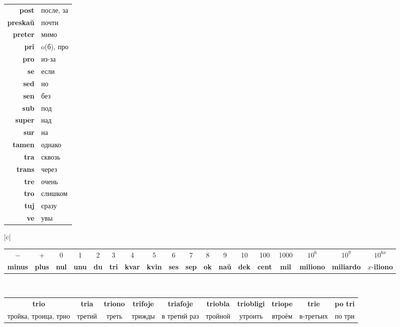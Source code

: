 \documentclass{article}
\def\b#1{\textbf{#1}}
\begin{document}
\begin{center}
\begin{tabular}{>{\bfseries}rl}
\end{tabular}
\hspace{-1.5em}
\begin{tabular}{>{\bfseries}rl}
post & после, за \\
preskaŭ & почти \\
preter & мимо \\
pri & o(б), про \\
pro & из-за \\
se & если \\
sed & но \\
sen & без \\
sub & под \\
super & над \\
sur & на \\
tamen & однако \\
tra & сквозь \\
trans & через \\
tre & очень \\
tro & слишком \\
tuj & сразу \\
ve & увы \\
\end{tabular}

\vspace{0.5em}
\begin{tabular}{|c|}
\hline
\begin{tabular}{c|c|c|c|c|c|c|c|c|c|c|c|c|c|c|c|c|c}
$-$ & $+$ & 0 & 1 & 2 & 3 & 4 & 5 & 6 & 7 & 8 & 9 & 10 & 100 & 1000 & $10^6$ & $10^9$ & $10^{6x}$ \\
\b{minus} & \b{plus} & \b{nul} & \b{unu} & \b{du} & \b{tri} & \b{kvar} & \b{kvin} & \b{ses} & \b{sep} & \b{ok} & \b{naŭ} & \b{dek} & \b{cent} & \b{mil} & \b{miliono} & \b{miliardo} & $x$-\b{iliono} \\
\end{tabular}\\
\hline
\begin{tabular}{c|c|c|c|c|c|c|c|c|c}
\b{trio} & \b{tria} & \b{triono} & \b{trifoje} & \b{triafoje} & \b{triobla} & \b{triobligi} & \b{triope} & \b{trie} & \b{po tri} \\
тройка, троица, трио & третий & треть & трижды & в третий раз & тройной & утроить & втроём  & в-третьих & по три \\
\end{tabular}\\
\hline
\end{tabular}


\end{center}
\end{document}
